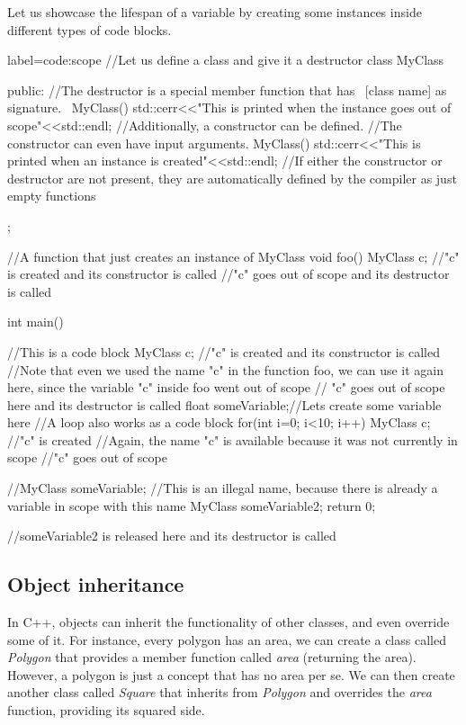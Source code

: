 \documentclass[ twoside,openright,titlepage,numbers=noenddot,%
headinclude,footinclude,cleardoublepage=empty,abstract=on,
BCOR=5mm,paper=a4,fontsize=11pt, dvipsnames
]{scrreprt}
\begin{document}
Let us showcase the lifespan of a variable by creating some instances inside different types of code blocks.
\begin{code2}{label=code:scope}
  //Let us define a class and give it a destructor
  class MyClass{

    public:
    //The destructor is a special member function that has ~[class name] as signature.
    ~MyClass(){
      std::cerr<<"This is printed when the instance goes out of scope"<<std::endl;
    }
    //Additionally, a constructor can be defined.
    //The constructor can even have input arguments.
    MyClass(){
      std::cerr<<"This is printed when an instance is created"<<std::endl;
    }
    //If either the constructor or destructor are not present, they are automatically defined by the compiler as just empty functions
  };

  //A function that just creates an instance of MyClass
  void foo(){
    MyClass c; //"c" is created and its constructor is called
  }//"c" goes out of scope and its destructor is called
  
  int main(){
    {//This is a code block
      MyClass c; //"c" is created and its constructor is called
      //Note that even we used the name "c" in the function foo, we can use it again here, since the variable "c" inside foo went out of scope
    }// "c" goes out of scope here and its destructor is called
    float someVariable;//Lets create some variable here
    //A loop also works as a code block
    for(int i=0; i<10; i++){
      MyClass c; //"c" is created
      //Again, the name "c" is available because it was not currently in scope
    }//"c" goes out of scope

    //MyClass someVariable; //This is an illegal name, because there is already a variable in scope with this name
    MyClass someVariable2;
    return 0;
  }//someVariable2 is released here and its destructor is called
\end{code2}

\subsection*{Object inheritance}
In C++, objects can inherit the functionality of other classes, and even override some of it. For instance, every polygon has an area, we can create a class called \emph{Polygon} that provides a member function called \emph{area} (returning the area). However, a polygon is just a concept that has no area per se. We can then create another class called \emph{Square} that inherits from \emph{Polygon} and overrides the \emph{area} function, providing its squared side.
\end{document}
